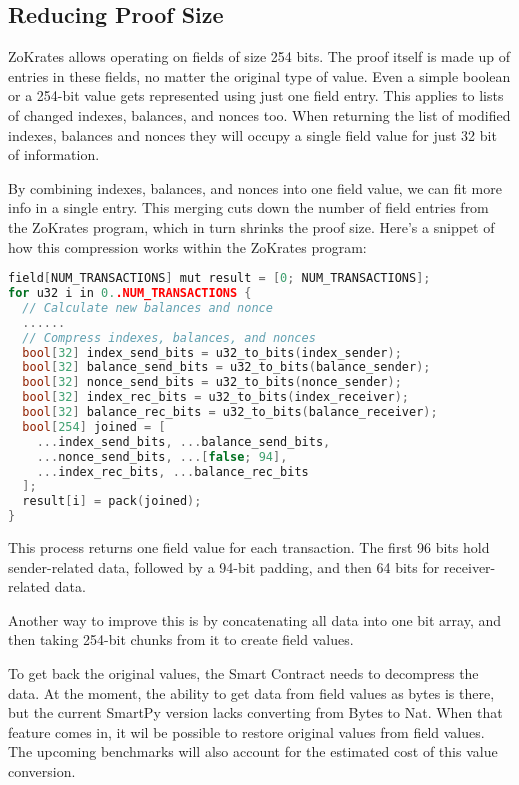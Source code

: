 \subsection{Reducing Proof Size}

ZoKrates allows operating on fields of size 254 bits. The proof itself is made up of entries in these fields, no matter the original type of value. Even a simple boolean or a 254-bit value gets represented using just one field entry. This applies to lists of changed indexes, balances, and nonces too. When returning the list of modified indexes, balances and nonces they will occupy a single field value for just 32 bit of information.

By combining indexes, balances, and nonces into one field value, we can fit more info in a single entry. This merging cuts down the number of field entries from the ZoKrates program, which in turn shrinks the proof size. Here's a snippet of how this compression works within the ZoKrates program:

\begin{lstlisting}[language=C++]
field[NUM_TRANSACTIONS] mut result = [0; NUM_TRANSACTIONS];
for u32 i in 0..NUM_TRANSACTIONS {
  // Calculate new balances and nonce
  ......
  // Compress indexes, balances, and nonces
  bool[32] index_send_bits = u32_to_bits(index_sender);
  bool[32] balance_send_bits = u32_to_bits(balance_sender);
  bool[32] nonce_send_bits = u32_to_bits(nonce_sender);
  bool[32] index_rec_bits = u32_to_bits(index_receiver);
  bool[32] balance_rec_bits = u32_to_bits(balance_receiver);
  bool[254] joined = [
    ...index_send_bits, ...balance_send_bits,
    ...nonce_send_bits, ...[false; 94],
    ...index_rec_bits, ...balance_rec_bits
  ];
  result[i] = pack(joined);
}
\end{lstlisting}

This process returns one field value for each transaction. The first 96 bits hold sender-related data, followed by a 94-bit padding, and then 64 bits for receiver-related data.

Another way to improve this is by concatenating all data into one bit array, and then taking 254-bit chunks from it to create field values.

To get back the original values, the Smart Contract needs to decompress the data. At the moment, the ability to get data from field values as bytes is there, but the current SmartPy version lacks converting from Bytes to Nat. When that feature comes in, it wil be possible to restore original values from field values. The upcoming benchmarks will also account for the estimated cost of this value conversion.

